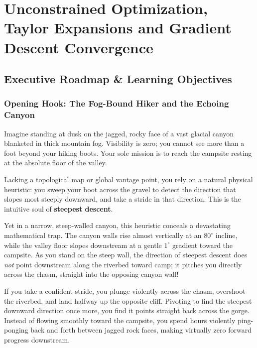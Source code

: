 \chapter[Unconstrained Optimization \& Gradient Descent]{Unconstrained Optimization, Taylor Expansions and Gradient Descent Convergence}
\label{chap:week08}

\section{Executive Roadmap \& Learning Objectives}

\subsection{Opening Hook: The Fog-Bound Hiker and the Echoing Canyon}
Imagine standing at dusk on the jagged, rocky face of a vast glacial canyon blanketed in thick mountain fog. Visibility is zero; you cannot see more than a foot beyond your hiking boots. Your sole mission is to reach the campsite resting at the absolute floor of the valley. 

Lacking a topological map or global vantage point, you rely on a natural physical heuristic: you sweep your boot across the gravel to detect the direction that slopes most steeply downward, and take a stride in that direction. This is the intuitive soul of \textbf{steepest descent}.

Yet in a narrow, steep-walled canyon, this heuristic conceals a devastating mathematical trap. The canyon walls rise almost vertically at an $80^\circ$ incline, while the valley floor slopes downstream at a gentle $1^\circ$ gradient toward the campsite. As you stand on the steep wall, the direction of steepest descent does \emph{not} point downstream along the riverbed toward camp; it pitches you directly across the chasm, straight into the opposing canyon wall! 

If you take a confident stride, you plunge violently across the chasm, overshoot the riverbed, and land halfway up the opposite cliff. Pivoting to find the steepest downward direction once more, you find it points straight back across the gorge. Instead of flowing smoothly toward the campsite, you spend hours violently ping-ponging back and forth between jagged rock faces, making virtually zero forward progress downstream.

